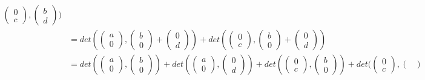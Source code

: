 \begin{example}
\begin{align*}
\begin{pmatrix}
        0 \\ c
    \end{pmatrix}, \begin{pmatrix}
        b \\ d
    \end{pmatrix})\tag{by Multilinearity}\\
    &=det(\begin{pmatrix}
        a \\ 0
    \end{pmatrix}, \begin{pmatrix}
        b \\ 0
    \end{pmatrix}+\begin{pmatrix}
        0 \\ d
    \end{pmatrix})+det(\begin{pmatrix}
        0 \\ c
    \end{pmatrix}, \begin{pmatrix}
        b \\ 0
    \end{pmatrix}+\begin{pmatrix}
        0 \\ d
    \end{pmatrix})\\
    &=det(\begin{pmatrix}
        a \\ 0
    \end{pmatrix}, \begin{pmatrix}
        b \\ 0
    \end{pmatrix})+det(\begin{pmatrix}
        a \\ 0
    \end{pmatrix}, \begin{pmatrix}
        0 \\ d
    \end{pmatrix})+det(\begin{pmatrix}
        0 \\ c
    \end{pmatrix}, \begin{pmatrix}
        b \\ 0
    \end{pmatrix})+det(\begin{pmatrix}
        0 \\ c
    \end{pmatrix}, \begin{pmatrix}

\end{pmatrix}
\end{align*}
\end{example}
